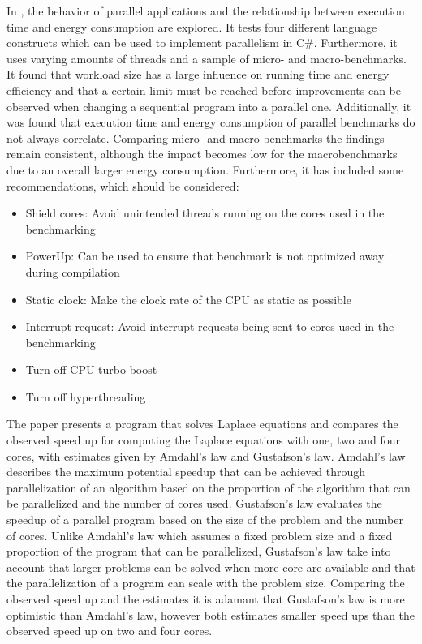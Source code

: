 In \cite{Lindholt}, the behavior of parallel applications and the relationship between execution time and energy consumption are explored. It tests four different language constructs which can be used to implement parallelism in C\#. Furthermore, it uses varying amounts of threads and a sample of micro- and macro-benchmarks. It found that workload size has a large influence on running time and energy efficiency and that a certain limit must be reached before improvements can be observed when changing a sequential program into a parallel one. Additionally, it was found that execution time and energy consumption of parallel benchmarks do not always correlate. Comparing micro- and macro-benchmarks the findings remain consistent, although the impact becomes low for the macrobenchmarks due to an overall larger energy consumption. Furthermore, it has included some recommendations, which should be considered:\cite{Lindholt}

\begin{itemize}
    \item Shield cores: Avoid unintended threads running on the cores used in the benchmarking
    \item PowerUp: Can be used to ensure that benchmark is not optimized away during compilation
    \item Static clock: Make the clock rate of the CPU as static as possible
    \item Interrupt request: Avoid interrupt requests being sent to cores used in the benchmarking 
    \item Turn off CPU turbo boost
    \item Turn off hyperthreading
\end{itemize}

The paper \cite{prinslow2011overview} presents a program that solves Laplace equations and compares the observed speed up for computing the Laplace equations with one, two and four cores, with estimates given by Amdahl's law and Gustafson's law.  Amdahl's law describes the maximum potential speedup that can be achieved through parallelization of an algorithm based on the proportion of the algorithm that can be parallelized and the number of cores used. Gustafson's law evaluates the speedup of a parallel program based on the size of the problem and the number of cores. Unlike Amdahl's law which assumes a fixed problem size and a fixed proportion of the program that can be parallelized, Gustafson's law take into account that larger problems can be solved when more core are available and that the parallelization of a program can scale with the problem size. Comparing the observed speed up and the estimates it is adamant that Gustafson's law is more optimistic than Amdahl's law, however both estimates smaller speed ups than the observed speed up on two and four cores. \cite{prinslow2011overview}